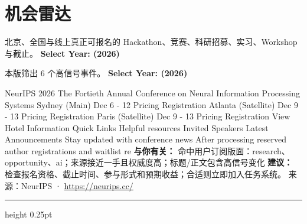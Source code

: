 \documentclass[10.5pt]{ctexart}
\begin{document}
\section*{机会雷达}
{\color{ormuted} 北京、全国与线上真正可报名的 Hackathon、竞赛、科研招募、实习、Workshop 与截止。}
\vspace{2mm}
{\LARGE\bfseries Select Year: (2026)}\par
\vspace{1mm}
{\color{ormuted} 本版筛出 6 个高信号事件。}
\vspace{3mm}
{\Large\bfseries Select Year: (2026)}\par
NeurIPS 2026 The Fortieth Annual Conference on Neural Information Processing Systems Sydney (Main) Dec 6 - 12 Pricing Registration Atlanta (Satellite) Dec 9 - 13 Pricing Registration Paris (Satellite) Dec 9 - 13 Pricing Registration View Hotel Information Quick Links Helpful resources Invited Speakers Latest Announcements Stay updated with conference news After processing reserved author registrations and waitlist re
\textbf{与你有关：} 命中用户订阅版面：research、opportunity、ai；来源接近一手且权威度高；标题/正文包含高信号变化
\textbf{建议：} 检查报名资格、截止时间、参与形式和预期收益；合适则立即加入任务系统。
{\footnotesize\color{ormuted} 来源：NeurIPS · \url{https://neurips.cc/}}
\vspace{4mm}
\hrule height 0.25pt
\vspace{3mm}
\end{document}
